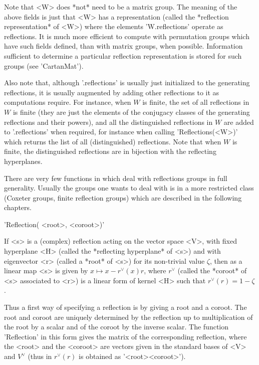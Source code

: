 Note that <W> does  *not* need to be a matrix group.  The meaning of the
above  fields  is  just  that  <W>  has  a  representation  (called  the
*reflection representation*  of <W>) where the  elements 'W.reflections'
operate  as reflections.  It  is  much more  efficient  to compute  with
permutation  groups which  have such  fields defined,  than with  matrix
groups, when possible. Information  sufficient to determine a particular
reflection representation is stored for such groups (see 'CartanMat').

Also  note that, although '.reflections' is usually just initialized to the
generating reflections, it is usually augmented by adding other reflections
to it as computations require. For instance, when $W$ is finite, the set of
all  reflections  in  $W$  is  finite  (they  are  just the elements of the
conjugacy  classes of the generating reflections and their powers), and all
the  distinguished  reflections  in  $W$  are  added to '.reflections' when
required,  for instance  when calling  'Reflections(<W>)' which returns the
list  of all (distinguished) reflections. Note that when $W$ is finite, the
distinguished reflections are in bijection with the reflecting hyperplanes.

There are  very few functions  in {\CHEVIE} which deal  with reflections
groups in full generality. Usually the groups one wants to deal with is
in a more  restricted class (Coxeter groups,  finite reflection groups)
which are described in the following chapters.


'Reflection( <root>, <coroot>)'

If <s> is a (complex) reflection acting on the vector space <V>, with fixed
hyperplane  <H>  (called  the  *reflecting  hyperplane*  of  <s>)  and with
eigenvector <r> (called a *root* of <s>) for its non-trivial value $\zeta$,
then  as  a  linear  map  <s>  is  given by $ x\mapsto x-r^\vee(x)r$, where
$r^\vee$ (called the *coroot* of <s> associated to <r>) is a linear form of
kernel <H> such that $r^\vee(r)=1-\zeta$.

Thus  a first  way of  specifying a  reflection is  by giving  a root and a
coroot. The root and coroot are uniquely determined by the reflection up to
multiplication  of the root  by a scalar  and of the  coroot by the inverse
scalar.  The function  'Reflection' in  this form  gives the  matrix of the
corresponding  reflection, where  the <root>  and the  <coroot> are vectors
given in the standard bases of <V> and $V^\vee$ (thus in {\GAP} $r^\vee(r)$
is obtained as '<root>\*<coroot>').

